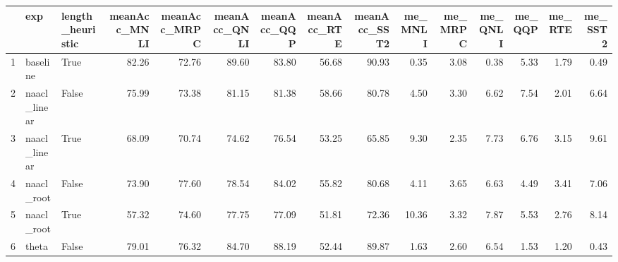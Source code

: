 \begin{table}[ht]
\centering
\begin{tabular}{rllrrrrrrrrrrrr}
  \hline
 & exp & length\_heuristic & meanAcc\_MNLI & meanAcc\_MRPC & meanAcc\_QNLI & meanAcc\_QQP & meanAcc\_RTE & meanAcc\_SST2 & me\_MNLI & me\_MRPC & me\_QNLI & me\_QQP & me\_RTE & me\_SST2 \\ 
  \hline
1 & baseline & True & 82.26 & 72.76 & 89.60 & 83.80 & 56.68 & 90.93 & 0.35 & 3.08 & 0.38 & 5.33 & 1.79 & 0.49 \\ 
  2 & naacl\_linear & False & 75.99 & 73.38 & 81.15 & 81.38 & 58.66 & 80.78 & 4.50 & 3.30 & 6.62 & 7.54 & 2.01 & 6.64 \\ 
  3 & naacl\_linear & True & 68.09 & 70.74 & 74.62 & 76.54 & 53.25 & 65.85 & 9.30 & 2.35 & 7.73 & 6.76 & 3.15 & 9.61 \\ 
  4 & naacl\_root & False & 73.90 & 77.60 & 78.54 & 84.02 & 55.82 & 80.68 & 4.11 & 3.65 & 6.63 & 4.49 & 3.41 & 7.06 \\ 
  5 & naacl\_root & True & 57.32 & 74.60 & 77.75 & 77.09 & 51.81 & 72.36 & 10.36 & 3.32 & 7.87 & 5.53 & 2.76 & 8.14 \\ 
  6 & theta & False & 79.01 & 76.32 & 84.70 & 88.19 & 52.44 & 89.87 & 1.63 & 2.60 & 6.54 & 1.53 & 1.20 & 0.43 \\ 
   \hline
\end{tabular}
\end{table}
